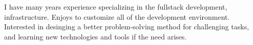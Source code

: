 

\begin{cvparagraph}

I have many years experience specializing in the fullstack development, infrastructure. Enjoys to customize all of the development environment. Interested in desinging a better problem-solving method for challenging tasks, and learning new technologies and tools if the need arises.
\end{cvparagraph}
